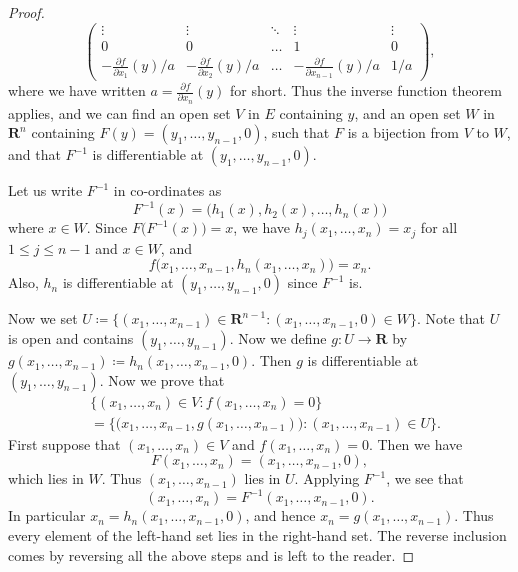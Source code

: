 \begin{proof}
\[\begin{pmatrix}
            \vdots                                  & \vdots                                  & \ddots & \vdots                                        & \vdots \\
            0                                       & 0                                       & \dots  & 1                                             & 0      \\
            -\frac{\partial f}{\partial x_1}(y) / a & -\frac{\partial f}{\partial x_2}(y) / a & \dots  & -\frac{\partial f}{\partial x_{n - 1}}(y) / a & 1 / a
        \end{pmatrix},
    \]
    where we have written \(a = \frac{\partial f}{\partial x_n}(y)\) for short.
    Thus the inverse function theorem applies, and we can find an open set \(V\) in \(E\) containing \(y\), and an open set \(W\) in \(\mathbf{R}^n\) containing \(F(y) = (y_1, \dots, y_{n - 1}, 0)\), such that \(F\) is a bijection from \(V\) to \(W\), and that \(F^{-1}\) is differentiable at \((y_1, \dots, y_{n - 1}, 0)\).

    Let us write \(F^{-1}\) in co-ordinates as
    \[
        F^{-1}(x) = \big(h_1(x), h_2(x), \dots, h_n(x)\big)
    \]
    where \(x \in W\).
    Since \(F\big(F^{-1}(x)\big) = x\), we have \(h_j(x_1, \dots, x_n) = x_j\) for all \(1 \leq j \leq n - 1\) and \(x \in W\), and
    \[
        f\big(x_1, \dots, x_{n - 1}, h_n(x_1, \dots, x_n)\big) = x_n.
    \]
    Also, \(h_n\) is differentiable at \((y_1, \dots, y_{n - 1}, 0)\) since \(F^{-1}\) is.

    Now we set \(U \coloneqq \{(x_1, \dots, x_{n - 1}) \in \mathbf{R}^{n - 1} : (x_1, \dots, x_{n - 1}, 0) \in W\}\).
    Note that \(U\) is open and contains \((y_1, \dots, y_{n - 1})\).
    Now we define \(g : U \to \mathbf{R}\) by \(g(x_1, \dots, x_{n - 1}) \coloneqq h_n(x_1, \dots, x_{n - 1}, 0)\).
    Then \(g\) is differentiable at \((y_1, \dots, y_{n - 1})\).
    Now we prove that
    \begin{align*}
         & \{(x_1, \dots, x_n) \in V : f(x_1, \dots, x_n) = 0\}                                                     \\
         & = \Big\{\big(x_1, \dots, x_{n - 1}, g(x_1, \dots, x_{n - 1})\big) : (x_1, \dots, x_{n - 1}) \in U\Big\}.
    \end{align*}
    First suppose that \((x_1, \dots, x_n) \in V\) and \(f(x_1, \dots, x_n) = 0\).
    Then we have
    \[
        F(x_1, \dots, x_n) = (x_1, \dots, x_{n - 1}, 0),
    \]
    which lies in \(W\).
    Thus \((x_1, \dots, x_{n - 1})\) lies in \(U\).
    Applying \(F^{-1}\), we see that
    \[
        (x_1, \dots, x_n) = F^{-1}(x_1, \dots, x_{n - 1}, 0).
    \]
    In particular \(x_n = h_n(x_1, \dots, x_{n - 1}, 0)\), and hence \(x_n = g(x_1, \dots, x_{n - 1})\).
    Thus every element of the left-hand set lies in the right-hand set.
    The reverse inclusion comes by reversing all the above steps and is left to the reader.


\end{proof}
